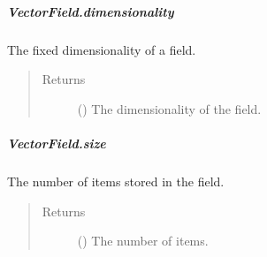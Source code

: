 \documentclass[letterpaper,10pt,english]{sphinxmanual}
\begin{document}
\begin{fulllineitems}
\subparagraph{VectorField.dimensionality}
\label{\detokenize{api/generated/directional_clustering.fields.VectorField.dimensionality:vectorfield-dimensionality}}\label{\detokenize{api/generated/directional_clustering.fields.VectorField.dimensionality::doc}}

\begin{fulllineitems}
\label{\detokenize{api/generated/directional_clustering.fields.VectorField.dimensionality:directional_clustering.fields.VectorField.dimensionality}}
The fixed dimensionality of a field.
\begin{quote}\begin{description}
\item[{Returns}] \leavevmode
{} () \textendash{} The dimensionality of the field.

\end{description}\end{quote}

\end{fulllineitems}



\subparagraph{VectorField.size}
\label{\detokenize{api/generated/directional_clustering.fields.VectorField.size:vectorfield-size}}\label{\detokenize{api/generated/directional_clustering.fields.VectorField.size::doc}}

\begin{fulllineitems}
\label{\detokenize{api/generated/directional_clustering.fields.VectorField.size:directional_clustering.fields.VectorField.size}}
The number of items stored in the field.
\begin{quote}\begin{description}
\item[{Returns}] \leavevmode
{} () \textendash{} The number of items.

\end{description}\end{quote}

\end{fulllineitems}


\end{fulllineitems}
\end{document}
